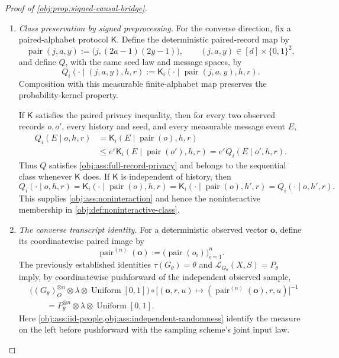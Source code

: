 \documentclass[11pt]{article}
\begin{document}
\begin{proof}[Proof of \cref{obj:prop:signed-causal-bridge}]
\begin{enumerate}
\item \emph{Class preservation by signed preprocessing.}
For the converse direction, fix a paired-alphabet protocol \(\mathsf K\).
Define the deterministic paired-record map by
\[
\operatorname{pair}(j,a,y)
:=\bigl(j,(2a-1)(2y-1)\bigr),
\qquad
(j,a,y)\in[d]\times\{0,1\}^2,
\]
and define \(Q\), with the same seed law and message spaces, by
\[
Q_i(\cdot\mid(j,a,y),h,r)
:=\mathsf K_i(\cdot\mid\operatorname{pair}(j,a,y),h,r).
\]
Composition with this measurable finite-alphabet map preserves the
probability-kernel property.

If \(\mathsf K\) satisfies the paired privacy inequality, then for every
two observed records \(o,o'\), every history and seed, and every
measurable message event \(E\),
\[
\begin{aligned}
Q_i(E\mid o,h,r)
&=\mathsf K_i(E\mid\operatorname{pair}(o),h,r)\\
&\le e^\varepsilon
 \mathsf K_i(E\mid\operatorname{pair}(o'),h,r)
=e^\varepsilon Q_i(E\mid o',h,r).
\end{aligned}
\]
Thus \(Q\) satisfies \cref{obj:ass:full-record-privacy} and belongs to
the sequential class whenever \(\mathsf K\) does. If \(\mathsf K\) is
independent of history, then
\[
Q_i(\cdot\mid o,h,r)
=\mathsf K_i(\cdot\mid\operatorname{pair}(o),h,r)
=\mathsf K_i(\cdot\mid\operatorname{pair}(o),h',r)
=Q_i(\cdot\mid o,h',r).
\]
This supplies \cref{obj:ass:noninteraction} and hence the noninteractive
membership in \cref{obj:def:noninteractive-class}.

\item \emph{The converse transcript identity.}
For a deterministic observed vector \(\mathbf o\), define its
coordinatewise paired image by
\[
\operatorname{pair}^{(n)}(\mathbf o)
:=\bigl(\operatorname{pair}(o_i)\bigr)_{i=1}^n.
\]
The previously established identities
\(\tau(G_\theta)=\theta\) and
\(\mathcal L_{G_\theta}(X,S)=P_\theta\) imply, by coordinatewise
pushforward of the independent observed sample,
\[
\begin{aligned}
&\bigl((G_\theta)_O^{\otimes n}
 \otimes\lambda\otimes\operatorname{Uniform}[0,1]\bigr)
 \circ
 \bigl[(\mathbf o,r,u)
 \mapsto(\operatorname{pair}^{(n)}(\mathbf o),r,u)\bigr]^{-1}\\
&\qquad=
P_\theta^{\otimes n}\otimes\lambda
 \otimes\operatorname{Uniform}[0,1].
\end{aligned}
\]
Here \cref{obj:ass:iid-people,obj:ass:independent-randomness} identify the
measure on the left before pushforward with the sampling scheme's
joint input law.


\end{enumerate}
\end{proof}
\end{document}
